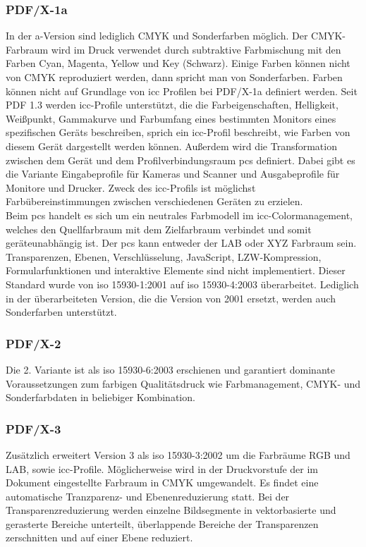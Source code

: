 \subsubsection{PDF/X-1a}
In der a-Version sind lediglich CMYK und Sonderfarben möglich. Der CMYK-Farbraum wird im Druck verwendet durch subtraktive Farbmischung mit den Farben Cyan, Magenta, Yellow und Key (Schwarz). Einige Farben können nicht von CMYK reproduziert werden, dann spricht man von Sonderfarben. Farben können nicht auf Grundlage von \gls{icc} Profilen bei PDF/X-1a definiert werden. \cite{adobe-pdf-x} Seit PDF 1.3 werden \gls{icc}-Profile unterstützt, die die Farbeigenschaften, Helligkeit, Weißpunkt, Gammakurve und Farbumfang eines bestimmten Monitors eines spezifischen Geräts beschreiben, sprich ein \gls{icc}-Profil beschreibt, wie Farben von diesem Gerät dargestellt werden können. Außerdem wird die Transformation zwischen dem Gerät und dem Profilverbindungsraum \gls{pcs} definiert. Dabei gibt es die Variante Eingabeprofile für Kameras und Scanner und Ausgabeprofile für Monitore und Drucker. Zweck des \gls{icc}-Profils ist möglichst Farbübereinstimmungen zwischen verschiedenen Geräten zu erzielen. \\ \cite{benq} Beim \gls{pcs} handelt es sich um ein neutrales Farbmodell im \gls{icc}-Colormanagement, welches den Quellfarbraum mit dem Zielfarbraum verbindet und somit geräteunabhängig ist. Der \gls{pcs} kann entweder der LAB oder XYZ Farbraum sein. \cite{prepress}
Transparenzen, Ebenen, Verschlüsselung, JavaScript, LZW-Kompression, Formularfunktionen und interaktive Elemente sind nicht implementiert. Dieser Standard wurde von \gls{iso} 15930-1:2001 auf \gls{iso} 15930-4:2003 überarbeitet. Lediglich in der überarbeiteten Version, die die Version von 2001 ersetzt, werden auch Sonderfarben unterstützt. \cite{proj-consult}

\subsubsection{PDF/X-2}
Die 2. Variante ist als \gls{iso} 15930-6:2003 erschienen und garantiert dominante Voraussetzungen zum farbigen Qualitätsdruck wie Farbmanagement, CMYK- und Sonderfarbdaten in beliebiger Kombination. \cite{proj-consult}

\subsubsection{PDF/X-3}
Zusätzlich erweitert Version 3 als \gls{iso} 15930-3:2002 \cite{proj-consult} um die Farbräume RGB und LAB, sowie \gls{icc}-Profile. Möglicherweise wird in der Druckvorstufe der im Dokument eingestellte Farbraum in CMYK umgewandelt. Es findet eine automatische Tranzparenz- und Ebenenreduzierung statt. \cite{adobe-pdf-x} Bei der Transparenzreduzierung werden einzelne Bildsegmente in vektorbasierte und gerasterte Bereiche unterteilt, überlappende Bereiche der Transparenzen zerschnitten und auf einer Ebene reduziert. \cite{adobe-transp, primus}

